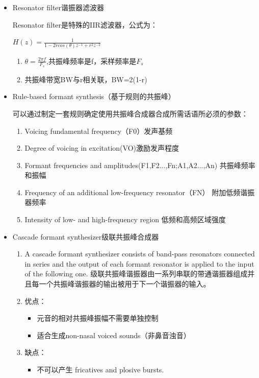 \documentclass[UTF8]{ctexart}
\begin{document}
\begin{itemize}
    \item Resonator filter谐振器滤波器
    
    Resonator filter是特殊的IIR滤波器，公式为：

    $H(z)=\frac{1}{1-2rcos(\theta)z^{-1}+r^2z^{-2}}$
    \begin{enumerate}
        \item $\theta=\frac{2\pi f}{F_{s}}$,共振峰频率是f，采样频率是$F_{s}$
        \item 共振峰带宽BW与r相关联，BW=2(1-r)
    \end{enumerate}

    \item Rule-based formant synthesis（基于规则的共振峰）
    
    可以通过制定一套规则确定使用共振峰合成器合成所需话语所必须的参数：
    \begin{enumerate}
        \item Voicing fundamental frequency（F0）发声基频
        \item Degree of voicing in excitation(VO)激励发声程度
        \item Formant frequencies and amplitudes(F1,F2...,Fn;A1,A2...,An) 共振峰频率和振幅
        \item Frequency of an additional low-frequency resonator（FN） 附加低频谐振器频率
        \item Intensity of low- and high-frequency region 低频和高频区域强度
    \end{enumerate}
    \item Cascade formant synthesizer级联共振峰合成器
    
    \begin{enumerate}
        \item A cascade formant synthesizer consists of band-pass resonators connected in series and the output of each formant resonator is applied to the input of the following one. 级联共振峰谐振器由一系列串联的带通谐振器组成并且每一个共振峰谐振器的输出被用于下一个谐振器的输入。
        \item 优点：
        \begin{itemize}
            \item 元音的相对共振峰振幅不需要单独控制
            \item 适合生成non-nasal voiced sounds（非鼻音浊音）
        \end{itemize}
        \item 缺点：
        \begin{itemize}
            \item 不可以产生 fricatives and plosive bursts.
        \end{itemize}
    \end{enumerate}


\end{itemize}
\end{document}
